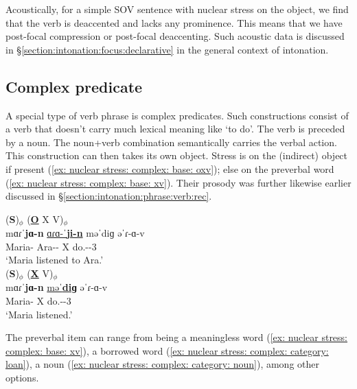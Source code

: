 Acoustically, for a simple SOV sentence with nuclear stress on the object, we find that the verb is deaccented and lacks any prominence. This means that we have post-focal compression or post-focal deaccenting. Such acoustic data is discussed in \S\ref{section:intonation:focus:declarative} in the general context of intonation. 



\subsection{Complex predicate}\label{section:intonation:broadFocus:complex}


A special type of verb phrase is complex predicates. Such constructions consist of a verb that doesn't carry much lexical meaning like `to do'. The verb is preceded by a noun. The noun+verb combination semantically carries the verbal action. This construction can then takes its own object. Stress is on the (indirect) object if present (\ref{ex: nuclear stress: complex: base: oxv}); else on the preverbal word (\ref{ex: nuclear stress: complex: base: xv}). Their prosody was further likewise earlier discussed in \S\ref{section:intonation:phrase:verb:rec}. 



\begin{exe}
	\ex 
	\begin{xlist}
		\ex \glll (\textbf{S})$_\phi$ (\textbf{\underline{O}} X V)$_\phi$ \\
		mɑɾˈ\textbf{jɑ-n} \underline{ɑɾɑ-ˈ\textbf{ji-n}} məˈdiɡ əˈɾ-ɑ-v \\
		Maria-{} Ara-{\dat}-{} X do.{\aorperf}-{\pst}-3{\pst} \\
		\trans `Maria listened to Ara.' \label{ex: nuclear stress: complex: base: oxv}
		\\ \armenian{Մարիան Արային մտիկ ըրաւ։}
		\ex \glll (\textbf{S})$_\phi$ (\textbf{\underline{X}} V)$_\phi$ \\
		mɑɾˈ\textbf{jɑ-n} \underline{məˈ\textbf{diɡ}} əˈɾ-ɑ-v \\
		Maria-{} X do.{\aorperf}-{\pst}-3{\pst} \\
		\trans `Maria listened.' \label{ex: nuclear stress: complex: base: xv}
		\\ 
	\end{xlist}
\end{exe}

The preverbal item can range from being a meaningless word (\ref{ex: nuclear stress: complex: base: xv}), a borrowed word (\ref{ex: nuclear stress: complex: category: loan}), a noun (\ref{ex: nuclear stress: complex: category: noun}), among other options. 



